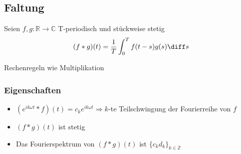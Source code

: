 \subsection{Faltung}
\begin{emphbox}
    Seien $f,g : \mathbb R \rightarrow\mathbb C$ T-periodisch und stückweise stetig
    \begin{equation*}
        (f * g)(t) = \frac{1}{T}\int_0^T f(t-s)g(s)\diff s
    \end{equation*}
\end{emphbox}
Rechenregeln wie Multiplikation

\begin{sectionbox}
    \subsubsection{Eigenschaften}
    \begin{itemize}
        \item $(e^{ik\omega t} * f)(t)=c_ke^{ik\omega t} \Rightarrow k$-te Teilschwingung der Fourierreihe von $f$
        \item $(f * g)(t)$ ist stetig
        \item Das Fourierspektrum von $(f * g)(t)$ ist $\{c_kd_k\}_{k\in\mathbb Z}$
    \end{itemize}
\end{sectionbox}


